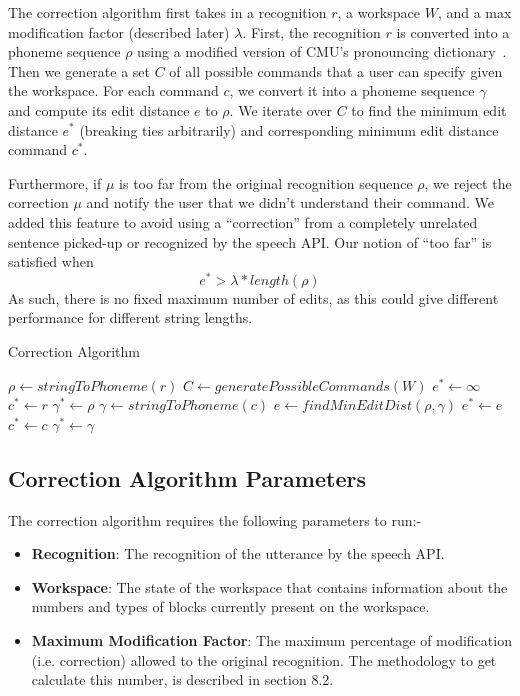 \documentclass[]{article}
\begin{document}
The correction algorithm first takes in a recognition $r$, a workspace $W$, and 
a max modification factor (described later) $\lambda$. First, the recognition 
$r$ is converted into a phoneme sequence $\rho$ using a modified version of 
CMU's pronouncing dictionary~\cite{rudnicky2015cmudict}. Then we generate a set 
$C$ of all possible commands that a user can specify given the workspace. For 
each command $c$, we convert it into a phoneme sequence $\gamma$ and compute 
its edit distance $e$ to $\rho$. We iterate over $C$ to find the minimum edit 
distance $e^*$ (breaking ties arbitrarily) and corresponding minimum edit 
distance command $c^*$.  

Furthermore, if $\mu$ is too far from the original recognition sequence $\rho$, 
we reject the correction  $\mu$ and notify the user that we didn't understand 
their command. We added this feature to avoid using a ``correction'' from a 
completely unrelated sentence picked-up or recognized by the speech API. Our 
notion of ``too far'' is satisfied when$$ e^* > \lambda * length(\rho)$$ As 
such, 
there is no fixed maximum number of edits, as this could give 
different performance for different string lengths. 
\begin{algorithm}
	\caption{Correction Algorithm}\label{CorrectionAlgorithm}
	\begin{algorithmic}[1]
		\State $\rho \leftarrow stringToPhoneme(r)$
		\State $C\leftarrow generatePossibleCommands(W) $
		\State $e^* \leftarrow \infty$
		\State $c^* \leftarrow r$
		\State $\gamma^* \leftarrow \rho$
			\State $\gamma \leftarrow stringToPhoneme(c)$
			\State $e \leftarrow findMinEditDist(\rho, \gamma)$
				\State $e^* \leftarrow e$
				\State $c^* \leftarrow c$
				\State $\gamma^* \leftarrow \gamma$
			\EndIf
		\EndFor
			\State {}
		\Else
			\State {}
		\EndIf
		\EndProcedure
	\end{algorithmic}
\end{algorithm}

\subsection{Correction Algorithm Parameters}
The correction algorithm requires the following parameters to run:-
\begin{itemize}
\item \textbf{Recognition}: The recognition of the utterance by the speech API.
\item \textbf{Workspace}: The state of the workspace that contains information about the numbers and types of blocks currently present on the workspace.
\item \textbf{Maximum Modification Factor}: The maximum percentage of modification (i.e. correction) allowed to the original recognition. The methodology to get calculate this number, is described in section 8.2.
\end{itemize}
\end{document}
